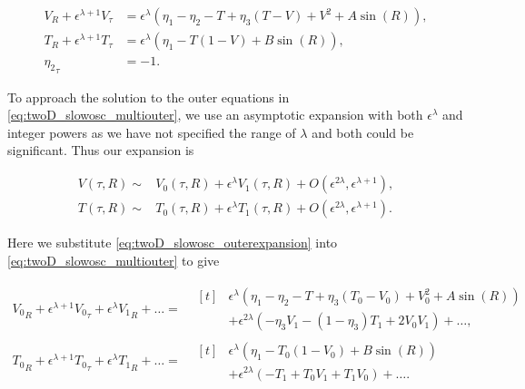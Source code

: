 \begin{equation}\label{eq:twoD_slowosc_multiouter}
 \begin{aligned}
V_R+\epsilon^{\lambda+1}V_\tau & = \epsilon^{\lambda} \left(\eta_1-\eta_2-		T+\eta_3(T-V)+V^2+A\sin(R)\right), \\
T_R+\epsilon^{\lambda+1}T_\tau & = \epsilon^{\lambda}\left( \eta_1-T(1-		 V)+B\sin(R)\right), \\
	{\eta_2}_\tau & = -1.
\end{aligned}
\end{equation}
 
To approach the solution to the outer equations in \eqref{eq:twoD_slowosc_multiouter}, we use an asymptotic expansion with both $\epsilon^\lambda$ and integer powers as we have not specified the range of $\lambda$ and both could be significant. Thus our expansion is

\begin{equation}\label{eq:twoD_slowosc_outerexpansion}
	\begin{aligned}
		V(\tau,R)\sim& V_0(\tau,R)+\epsilon^\lambda 	V_1(\tau,R)+O(\epsilon^{2\lambda},\epsilon^{\lambda+1}),\\
    T(\tau,R)\sim& T_0(\tau,R)+\epsilon^\lambda T_1(\tau,R)+O(\epsilon^{2\lambda},\epsilon^{\lambda+1}).
	\end{aligned}
\end{equation}

Here we substitute \eqref{eq:twoD_slowosc_outerexpansion} into \eqref{eq:twoD_slowosc_multiouter} to give

\begin{equation*}
\begin{aligned}
{V_0}_R+\epsilon^{\lambda+1}{V_0}_\tau+\epsilon^\lambda {V_1}_R+\ldots=&\begin{aligned}[t]&
\epsilon^\lambda \left(\eta_1-\eta_2-T+\eta_3(T_0-V_0)+V_0^2+A\sin(R)\right)\\
&+\epsilon^{2\lambda}\left(-\eta_3 V_1-(1-\eta_3)T_1+2V_0V_1\right)+\ldots,
\end{aligned}\\
{T_0}_R+\epsilon^{\lambda+1}{T_0}_\tau+\epsilon^\lambda {T_1}_R+\ldots=&\begin{aligned}[t]&
\epsilon^\lambda\left( \eta_1-T_0(1-V_0)+B\sin(R)\right)\\
&+\epsilon^{2\lambda}\left(-T_1+T_0V_1+T_1V_0\right)+\ldots.
\end{aligned}
\end{aligned}
\end{equation*}

